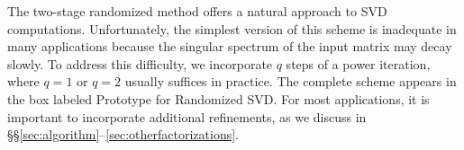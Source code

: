 \documentclass{article}
\begin{document}


The two-stage randomized method offers a natural approach to SVD computations.
Unfortunately, the simplest version of this scheme is inadequate in many
applications because the singular spectrum of the input matrix may decay
slowly.  To address this difficulty, we incorporate $q$ steps of a power
iteration, where $q = 1$ or $q = 2$ usually suffices in practice.  The
complete scheme appears in the box labeled Prototype for Randomized SVD.
For most applications, it is important to incorporate additional refinements,
as we discuss in \S\S\ref{sec:algorithm}--\ref{sec:otherfactorizations}.
\end{document}
